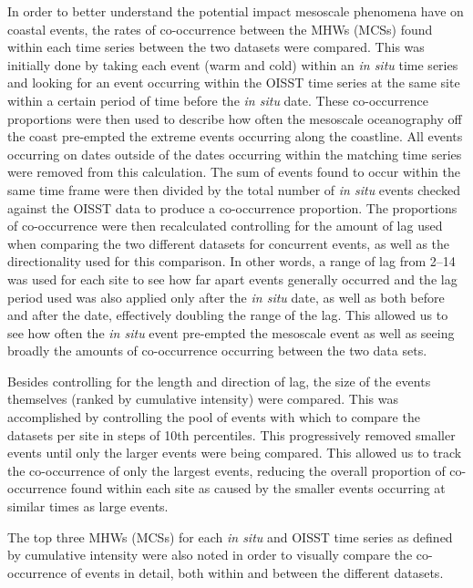 \documentclass[a4paper,10pt,review]{elsarticle}
\begin{document}
In order to better understand the potential impact mesoscale phenomena have on coastal events, the rates of co-occurrence between the MHWs (MCSs) found within each time series between the two datasets were compared. This was initially done by taking each event (warm and cold) within an \emph{in situ} time series and looking for an event occurring within the OISST time series at the same site within a certain period of time before the \emph{in situ} date. These co-occurrence proportions were then used to describe how often the mesoscale oceanography off the coast pre-empted the extreme events occurring along the coastline. All events occurring on dates outside of the dates occurring within the matching time series were removed from this calculation. The sum of events found to occur within the same time frame were then divided by the total number of \emph{in situ} events checked against the OISST data to produce a co-occurrence proportion. The proportions of co-occurrence were then recalculated controlling for the amount of lag used when comparing the two different datasets for concurrent events, as well as the directionality used for this comparison. In other words, a range of lag from 2--14 was used for each site to see how far apart events generally occurred and the lag period used was also applied only after the \emph{in situ} date, as well as both before and after the date, effectively doubling the range of the lag. This allowed us to see how often the \emph{in situ} event pre-empted the mesoscale event as well as seeing broadly the amounts of co-occurrence occurring between the two data sets.

Besides controlling for the length and direction of lag, the size of the events themselves (ranked by cumulative intensity) were compared. This was accomplished by controlling the pool of events with which to compare the datasets per site in steps of 10th percentiles. This progressively removed smaller events until only the larger events were being compared. This allowed us to track the co-occurrence of only the largest events, reducing the overall proportion of co-occurrence found within each site as caused by the smaller events occurring at similar times as large events.

The top three MHWs (MCSs) for each \emph{in situ} and OISST time series as defined by cumulative intensity were also noted in order to visually compare the co-occurrence of events in detail, both within and between the different datasets.
\end{document}
